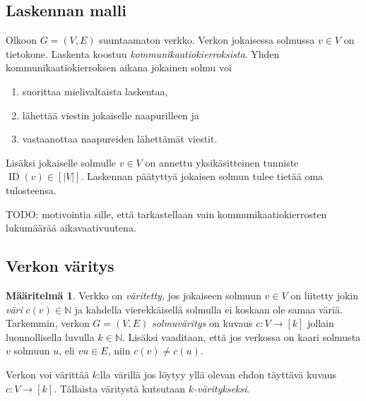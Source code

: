 \documentclass[finnish]{tktltiki2}
\theoremstyle{definition}
\newtheorem{maar}[lau]{Määritelmä}
\theoremstyle{remark}
\newcommand{\nat}{\mathbb{N}}
\newcommand{\from}{\colon}
\DeclareMathOperator{\id}{ID}
\begin{document}
\subsection{Laskennan malli}

Olkoon $G = (V,E)$ suuntaamaton verkko. Verkon jokaisessa solmussa $v \in V$ on
tietokone. Laskenta koostuu \emph{kommunikaatiokierroksista}. Yhden
kommunikaatiokierroksen aikana jokainen solmu voi

\begin{enumerate}
    \item suorittaa mielivaltaista laskentaa,
    \item lähettää viestin jokaiselle naapurilleen ja
    \item vastaanottaa naapureiden lähettämät viestit.
\end{enumerate}

Lisäksi jokaiselle solmulle $v \in V$ on annettu yksikäsitteinen tunniste
$\id(v) \in [|V|]$. Laskennan päätyttyä jokaisen solmun tulee
tietää oma tulosteensa.

TODO: motivointia sille, että tarkastellaan vain kommunikaatiokierrosten
lukumäärää aikavaativuutena.

\subsection{Verkon väritys}

\begin{maar}
    Verkko on \emph{väritetty}, jos jokaiseen solmuun $v \in V$ on liitetty jokin
    \emph{väri} $c(v) \in \nat$ ja kahdella vierekkäisellä solmulla ei koskaan ole
    samaa väriä.  Tarkemmin, verkon $G = (V,E)$ \emph{solmuväritys} on kuvaus $c \from
    V \to [k]$ jollain luonnollisella luvulla $k \in \nat$.
    Lisäksi vaaditaan, että jos verkossa on kaari solmusta $v$ solmuun $u$, eli $vu
    \in E$, niin $c(v) \neq c(u)$.

    Verkon voi värittää $k$:lla värillä jos löytyy yllä olevan ehdon täyttävä
    kuvaus $c \from V \to [k]$. Tällaista väritystä kutsutaan
    \emph{$k$-väritykseksi}.
\end{maar}

\end{document}
